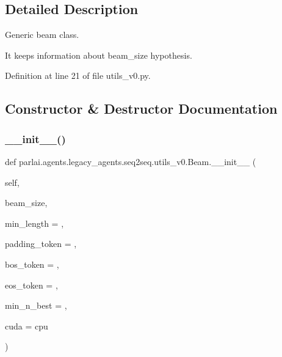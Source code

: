 \subsection{Detailed Description}
\begin{DoxyVerb}Generic beam class.

It keeps information about beam_size hypothesis.
\end{DoxyVerb}
 

Definition at line 21 of file utils\+\_\+v0.\+py.



\subsection{Constructor \& Destructor Documentation}
\mbox{\label{classparlai_1_1agents_1_1legacy__agents_1_1seq2seq_1_1utils__v0_1_1Beam_a0b15ba633165fe8ae84f7664dc893b99}} 
\subsubsection{\texorpdfstring{\+\_\+\+\_\+init\+\_\+\+\_\+()}{\_\_init\_\_()}}
{\footnotesize\ttfamily def parlai.\+agents.\+legacy\+\_\+agents.\+seq2seq.\+utils\+\_\+v0.\+Beam.\+\_\+\+\_\+init\+\_\+\+\_\+ (\begin{DoxyParamCaption}\item[{}]{self,  }\item[{}]{beam\+\_\+size,  }\item[{}]{min\+\_\+length = {},  }\item[{}]{padding\+\_\+token = {},  }\item[{}]{bos\+\_\+token = {},  }\item[{}]{eos\+\_\+token = {},  }\item[{}]{min\+\_\+n\+\_\+best = {},  }\item[{}]{cuda = {\ttfamily \textquotesingle{}cpu\textquotesingle{}} }\end{DoxyParamCaption})}

